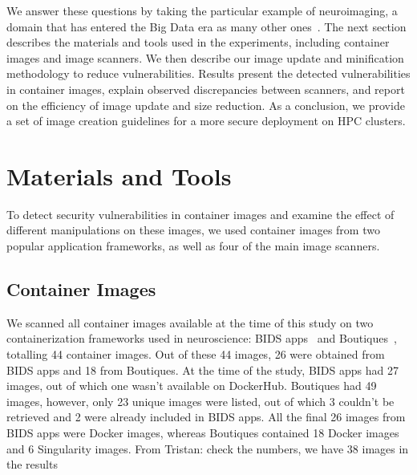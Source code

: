 \documentclass[a4paper,num-refs]{oup-contemporary}
\newcommand{\tristan}[1]{\color{blue}From Tristan: #1\color{black}}
\begin{document}
We answer these questions by taking the particular example of neuroimaging,
a domain that has entered the Big Data era as many other
ones~\cite{van2014human}. The next section describes the materials and
tools used in the experiments, including container images and image
scanners. We then describe our image update and minification methodology to
reduce vulnerabilities. Results present the detected vulnerabilities in
container images, explain observed discrepancies between scanners, and
report on the efficiency of image update and size reduction. As a
conclusion, we provide a set of image creation guidelines for a more secure
deployment on HPC clusters.







\section{Materials and Tools}

To detect security vulnerabilities
in container images and examine the effect of different
manipulations on these images, we used container
images from two popular application frameworks, as well as
four of the main image scanners.

\subsection{Container Images}

We scanned all container images available at the time of this study on two containerization frameworks
used in neuroscience: BIDS
apps~\cite{gorgolewski2017bids} and Boutiques~\cite{glatard2018boutiques},
totalling
44 container images.
Out of these 44 images, 26 were obtained from BIDS apps 
and 18 from Boutiques. At the time of the study, BIDS apps had 27 images,
out of which one wasn't available on DockerHub. Boutiques had 49 images,
however, only 23 unique images were listed, out of which 3 couldn't be retrieved and 2
were already included in BIDS apps. All the final 26 images
from BIDS apps were Docker images, whereas Boutiques contained 18 Docker images
and 6 Singularity images. \tristan{check the numbers, we have 38 images in the results}
\end{document}

